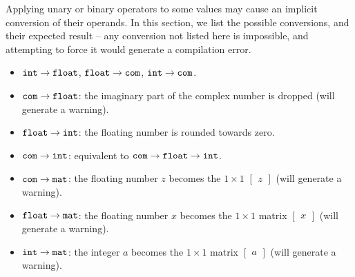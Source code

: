 Applying unary or binary operators to some values may cause an implicit conversion of their operands. In this section, we list the possible conversions, and their expected result -- any conversion not listed here is impossible, and attempting to force it would generate a compilation error.

\begin{itemize}
  \item $\texttt{int}\to\texttt{float}$, $\texttt{float}\to\texttt{com}$, $\texttt{int}\to\texttt{com}$.
  \item $\texttt{com}\to\texttt{float}$: the imaginary part of the complex number is dropped (will generate a warning).
  \item $\texttt{float}\to\texttt{int}$: the floating number is rounded towards zero.
  \item $\texttt{com}\to\texttt{int}$: equivalent to $\texttt{com}\to\texttt{float}\to\texttt{int}$.
  \item $\texttt{com}\to\texttt{mat}$: the floating number $z$ becomes the $1\times1$ $\begin{bmatrix} z \end{bmatrix}$ (will generate a warning).
  \item $\texttt{float}\to\texttt{mat}$: the floating number $x$ becomes the $1\times1$ matrix $\begin{bmatrix} x \end{bmatrix}$ (will generate a warning).
  \item $\texttt{int}\to\texttt{mat}$: the integer $a$ becomes the $1\times1$ matrix $\begin{bmatrix} a \end{bmatrix}$ (will generate a warning).
\end{itemize}
